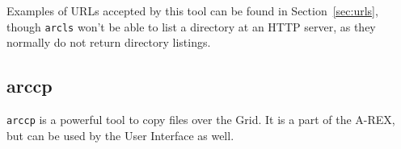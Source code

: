 Examples of URLs accepted by this tool can be found in
Section~\ref{sec:urls}, though \texttt{arcls} won't be able to list a
directory at an HTTP server, as they normally do not return directory
listings.

\subsection{arccp}\label{sec:arccp}

\texttt{arccp} is a powerful
tool to copy files over the Grid. It is a part of the A-REX,
but can be used by the User Interface as well.
\hspace*{0.5cm}
\begin{shaded}
\end{shaded}
